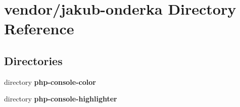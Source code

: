 \section{vendor/jakub-\/onderka Directory Reference}
\label{dir_8b0fb248f46abacd4dd5cd2a6fd22a95}
\subsection*{Directories}
\begin{DoxyCompactItemize}
\item 
directory {\bf php-\/console-\/color}
\item 
directory {\bf php-\/console-\/highlighter}
\end{DoxyCompactItemize}
